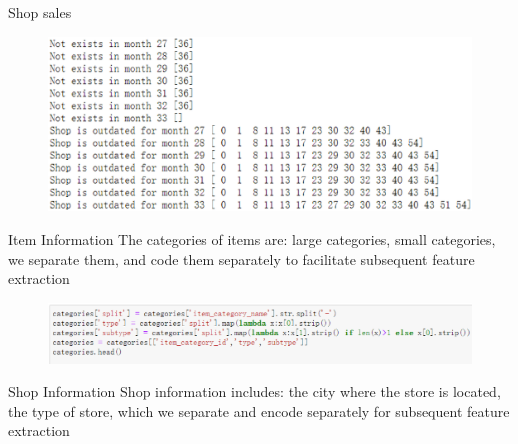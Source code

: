 \documentclass[
 size=14pt,
 paper=smartboard,  %
 mode=present, 		%
 display=slides, 	%
 style=tuliplab,  	%
 pauseslide,
 fleqn,leqno]{powerdot}
\begin{document}
\begin{slide}[toc=,bm=]{Shop sales}
  \begin{figure}
    \includegraphics[scale=0.5]{picture/data_11.eps}
  \end{figure}
\end{slide}

\begin{slide}[toc=,bm=]{Item Information}
  The categories of items are: large categories, small categories, we separate them, and code them separately to facilitate subsequent feature extraction
  \begin{figure}
    \includegraphics[scale=0.5]{picture/data_13.eps}
  \end{figure}
\end{slide}



\begin{slide}[toc=,bm=]{Shop Information}
  Shop information includes: the city where the store is located, the type of store, which we separate and encode separately for subsequent feature extraction
\end{slide}
\end{document}
